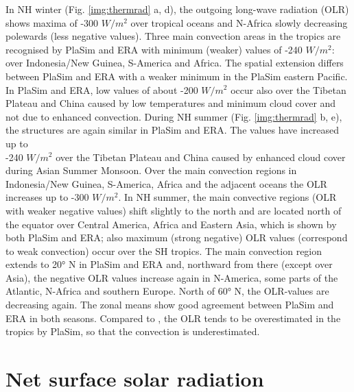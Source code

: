 \documentclass[12pt,a4paper,twoside,openright,headinclude,liststotoc,bibtotoc]{scrreprt}
\begin{document}
In NH winter (Fig. \ref{img:thermrad} a, d), the outgoing long-wave radiation (OLR) shows maxima of -300 $W/m^2$ over tropical oceans and N-Africa slowly decreasing polewards (less negative values). Three main convection areas in the tropics are recognised by PlaSim and ERA with minimum (weaker) values of -240 $W/m^2$: over Indonesia/New Guinea, S-America and Africa. The spatial extension differs between PlaSim and ERA with a weaker minimum in the PlaSim eastern Pacific. In PlaSim and ERA, low values of about -200 $W/m^2$ occur also over the Tibetan Plateau and China caused by low temperatures and minimum cloud cover and not due to enhanced convection. During NH summer (Fig. \ref{img:thermrad} b, e), the structures are again similar in PlaSim and ERA. The values have increased up to\\ -240 $W/m^2$ over the Tibetan Plateau and China caused by enhanced cloud cover during Asian Summer Monsoon. Over the main convection regions in Indonesia/New Guinea, S-America, Africa and the adjacent oceans the OLR increases up to -300 $W/m^2$. In NH summer, the main convective regions (OLR with weaker negative values) shift slightly to the north and are located north of the equator over Central America, Africa and Eastern Asia, which is shown by both PlaSim and ERA; also maximum (strong negative) OLR values (correspond to weak convection) occur over the SH tropics. The main convection region extends to 20° N in PlaSim and ERA and, northward from there (except over Asia), the negative OLR values increase again in N-America, some parts of the Atlantic, N-Africa and southern Europe. North of 60° N, the OLR-values are decreasing again. The zonal means show good agreement between PlaSim and ERA in both seasons. Compared to \citet{Gates1999}, the OLR tends to be overestimated in the tropics by PlaSim, so that the convection is underestimated.


\vspace{-0.4cm}
\section{Net surface solar radiation}
\vspace{-0.4cm}
\end{document}
